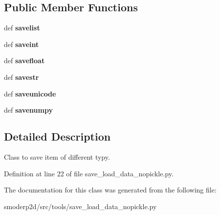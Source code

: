 \subsection*{Public Member Functions}
\begin{DoxyCompactItemize}
\item 
\hypertarget{classsmoderp2d_1_1src_1_1tools_1_1save__load__data__nopickle_1_1SaveItems_a9b7ab58852c2ec9ac5eef3697891a971}{def {\bfseries savelist}}\label{classsmoderp2d_1_1src_1_1tools_1_1save__load__data__nopickle_1_1SaveItems_a9b7ab58852c2ec9ac5eef3697891a971}

\item 
\hypertarget{classsmoderp2d_1_1src_1_1tools_1_1save__load__data__nopickle_1_1SaveItems_aae4bd717ff245f0866e1a3d2344f6e88}{def {\bfseries saveint}}\label{classsmoderp2d_1_1src_1_1tools_1_1save__load__data__nopickle_1_1SaveItems_aae4bd717ff245f0866e1a3d2344f6e88}

\item 
\hypertarget{classsmoderp2d_1_1src_1_1tools_1_1save__load__data__nopickle_1_1SaveItems_aaa5119329a342c10796e2bbbe43a4c04}{def {\bfseries savefloat}}\label{classsmoderp2d_1_1src_1_1tools_1_1save__load__data__nopickle_1_1SaveItems_aaa5119329a342c10796e2bbbe43a4c04}

\item 
\hypertarget{classsmoderp2d_1_1src_1_1tools_1_1save__load__data__nopickle_1_1SaveItems_a9aeb5708cc4eec875ecdde27a41359b1}{def {\bfseries savestr}}\label{classsmoderp2d_1_1src_1_1tools_1_1save__load__data__nopickle_1_1SaveItems_a9aeb5708cc4eec875ecdde27a41359b1}

\item 
\hypertarget{classsmoderp2d_1_1src_1_1tools_1_1save__load__data__nopickle_1_1SaveItems_aec22b79dd1a286a28cd142ddd07deaae}{def {\bfseries saveunicode}}\label{classsmoderp2d_1_1src_1_1tools_1_1save__load__data__nopickle_1_1SaveItems_aec22b79dd1a286a28cd142ddd07deaae}

\item 
\hypertarget{classsmoderp2d_1_1src_1_1tools_1_1save__load__data__nopickle_1_1SaveItems_ac9ca6022e3f3045e5bd4a1327656ee63}{def {\bfseries savenumpy}}\label{classsmoderp2d_1_1src_1_1tools_1_1save__load__data__nopickle_1_1SaveItems_ac9ca6022e3f3045e5bd4a1327656ee63}

\end{DoxyCompactItemize}


\subsection{Detailed Description}
Class to save item of different typy. 

Definition at line 22 of file save\-\_\-load\-\_\-data\-\_\-nopickle.\-py.



The documentation for this class was generated from the following file\-:\begin{DoxyCompactItemize}
\item 
smoderp2d/src/tools/save\-\_\-load\-\_\-data\-\_\-nopickle.\-py\end{DoxyCompactItemize}
